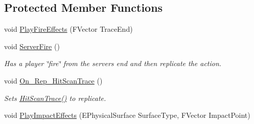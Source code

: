 \subsection*{Protected Member Functions}
\begin{DoxyCompactItemize}
\item 
void \mbox{\hyperlink{class_a_my_weapon___gun_a8d4f24314bfe7d7f722f1f03a9b52936}{Play\+Fire\+Effects}} (F\+Vector Trace\+End)
\item 
\mbox{\label{class_a_my_weapon___gun_a705560269295e26bb47af646ddee16bb}} 
void \mbox{\hyperlink{class_a_my_weapon___gun_a705560269295e26bb47af646ddee16bb}{Server\+Fire}} ()
\begin{DoxyCompactList}\small\item\em Has a player \char`\"{}fire\char`\"{} from the server\textquotesingle{}s end and then replicate the action. \end{DoxyCompactList}\item 
\mbox{\label{class_a_my_weapon___gun_af37b774edf0e46530795e38cb55c69ae}} 
void \mbox{\hyperlink{class_a_my_weapon___gun_af37b774edf0e46530795e38cb55c69ae}{On\+\_\+\+Rep\+\_\+\+Hit\+Scan\+Trace}} ()
\begin{DoxyCompactList}\small\item\em Sets \mbox{\hyperlink{class_a_my_weapon___gun_a63a32b90438b170a8b5b41a83051cb3e}{Hit\+Scan\+Trace()}} to replicate. \end{DoxyCompactList}\item 
void \mbox{\hyperlink{class_a_my_weapon___gun_a2a734edf94e9c1aa40194c60a6116c99}{Play\+Impact\+Effects}} (E\+Physical\+Surface Surface\+Type, F\+Vector Impact\+Point)
\end{DoxyCompactItemize}
